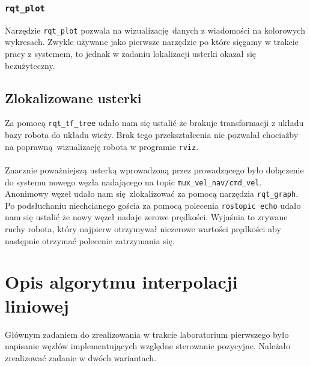 \documentclass{mwrep}
\begin{document}
\subsubsection{\texttt{rqt\_{}plot}}
Narzędzie \texttt{rqt\_{}plot} pozwala na wizualizację danych z wiadomości
na kolorowych wykresach. Zwykle używane jako pierwsze narzędzie po które sięgamy 
w trakcie pracy z systemem, to jednak w zadaniu lokalizacji usterki okazał się 
bezużyteczny. 

\subsection{Zlokalizowane usterki}
Za pomocą \texttt{rqt\_{}tf\_{}tree} udało nam się ustalić że brakuje transformacji z
układu bazy robota do układu wieży. Brak tego przekształcenia nie pozwalał chociażby
na poprawną wizualizację robota w programie \texttt{rviz}. \\
\\
Znacznie poważniejszą usterką wprowadzoną przez prowadzącego było dołączenie do systemu
nowego węzła nadającego na topic \texttt{mux\_{}vel\_{}nav/cmd\_{}vel}. Anonimowy węzeł 
udało nam się zlokalizować za pomocą narzędzia \texttt{rqt\_{}graph}. Po podsłuchaniu 
niechcianego gościa za pomocą polecenia \texttt{rostopic echo} udało nam się ustalić 
że nowy węzeł nadaje zerowe prędkości. Wyjaśnia to zrywane ruchy robota, który najpierw
otrzymywał niezerowe wartości prędkości aby następnie otrzymać polecenie zatrzymania się.

\section{Opis algorytmu interpolacji liniowej}
Głównym zadaniem do zrealizowania w trakcie laboratorium pierwszego było napisanie węzłów
implementujących względne sterowanie pozycyjne. Należało zrealizować zadanie w dwóch
wariantach. 
\end{document}
